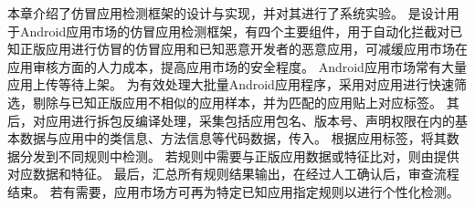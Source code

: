 本章介绍了仿冒应用检测框架\mytool 的设计与实现，并对其进行了系统实验。
\mytool 是设计用于Android应用市场的仿冒应用检测框架，有四个主要组件，用于自动化拦截对已知正版应用进行仿冒的仿冒应用和已知恶意开发者的恶意应用，可减缓应用市场在应用审核方面的人力成本，提高应用市场的安全程度。
Android应用市场常有大量应用上传等待上架。
为有效处理大批量Android应用程序，\mytool 采用\componentA 对应用进行快速筛选，剔除与已知正版应用不相似的应用样本，并为匹配的应用贴上对应标签。
其后，\componentB 对应用进行拆包反编译处理，采集包括应用包名、版本号、声明权限在内的基本数据与应用中的类信息、方法信息等代码数据，传入\componentC 。
\componentC 根据应用标签，将其数据分发到不同规则中检测。
若规则中需要与正版应用数据或特征比对，则由\componentD 提供对应数据和特征。
最后，\componentC 汇总所有规则结果输出，在经过人工确认后，审查流程结束。
若有需要，应用市场方可再为特定已知应用指定规则以进行个性化检测。
